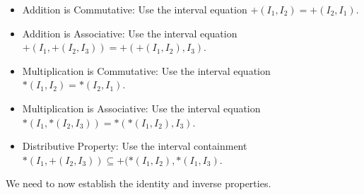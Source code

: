 \documentclass[12pt]{article}
\theoremstyle{remark}
\begin{document}
\begin{itemize}
    \item Addition is Commutative:  Use the interval equation $+(I_1, I_2) = +(I_2, I_1)$.
    \item Addition is Associative: Use the interval equation $+(I_1, +(I_2, I_3)) = +(+(I_1, I_2), I_3)$.
    \item Multiplication is Commutative: Use the interval equation $*(I_1, I_2) = *(I_2, I_1)$.
    \item Multiplication is Associative: Use the interval equation $*(I_1, *(I_2, I_3)) = *(*(I_1, I_2), I_3)$.
    \item Distributive Property: Use the interval containment $*(I_1, +(I_2, I_3)) \subseteq +(*(I_1, I_2), *(I_1, I_3)$.
\end{itemize}

We need to now establish the identity and inverse properties. 
\end{document}
